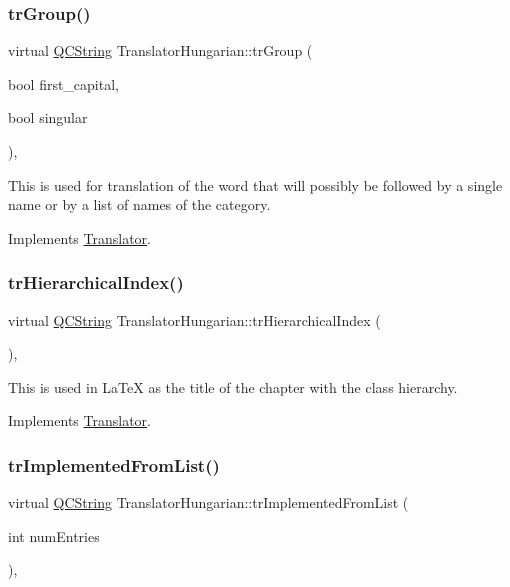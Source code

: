 \subsubsection{\texorpdfstring{trGroup()}{trGroup()}}
{\footnotesize\ttfamily virtual \mbox{\hyperlink{class_q_c_string}{Q\+C\+String}} Translator\+Hungarian\+::tr\+Group (\begin{DoxyParamCaption}\item[{bool}]{first\+\_\+capital,  }\item[{bool}]{singular }\end{DoxyParamCaption})\hspace{0.3cm}{\ttfamily [inline]}, {\ttfamily [virtual]}}

This is used for translation of the word that will possibly be followed by a single name or by a list of names of the category. 

Implements \mbox{\hyperlink{class_translator}{Translator}}.

\mbox{\label{class_translator_hungarian_a298526b1e8a0b011926c1f6f2bd5fefe}} 
\subsubsection{\texorpdfstring{trHierarchicalIndex()}{trHierarchicalIndex()}}
{\footnotesize\ttfamily virtual \mbox{\hyperlink{class_q_c_string}{Q\+C\+String}} Translator\+Hungarian\+::tr\+Hierarchical\+Index (\begin{DoxyParamCaption}{ }\end{DoxyParamCaption})\hspace{0.3cm}{\ttfamily [inline]}, {\ttfamily [virtual]}}

This is used in La\+TeX as the title of the chapter with the class hierarchy. 

Implements \mbox{\hyperlink{class_translator}{Translator}}.

\mbox{\label{class_translator_hungarian_a45602139d6221a4be33d1da1adc01961}} 
\subsubsection{\texorpdfstring{trImplementedFromList()}{trImplementedFromList()}}
{\footnotesize\ttfamily virtual \mbox{\hyperlink{class_q_c_string}{Q\+C\+String}} Translator\+Hungarian\+::tr\+Implemented\+From\+List (\begin{DoxyParamCaption}\item[{int}]{num\+Entries }\end{DoxyParamCaption})\hspace{0.3cm}{\ttfamily [inline]}, {\ttfamily [virtual]}}

